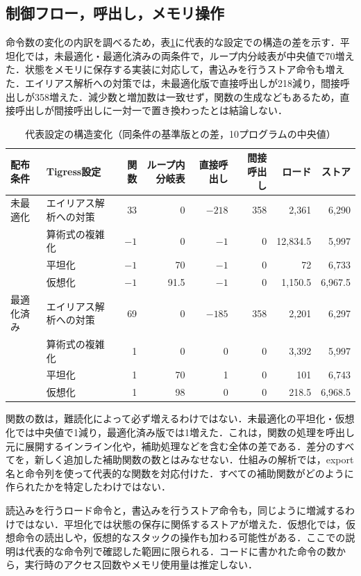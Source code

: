 \documentclass[submit,techrep]{ipsj}
\begin{document}
\subsection{制御フロー，呼出し，メモリ操作}
命令数の変化の内訳を調べるため，表\ref{tab:structure}に代表的な設定での構造の差を示す．平坦化では，未最適化・最適化済みの両条件で，ループ内分岐表が中央値で70増えた．状態をメモリに保存する実装に対応して，書込みを行うストア命令も増えた．エイリアス解析への対策では，未最適化版で直接呼出しが218減り，間接呼出しが358増えた．減少数と増加数は一致せず，関数の生成などもあるため，直接呼出しが間接呼出しに一対一で置き換わったとは結論しない．
\begin{table}[t]
\caption{代表設定の構造変化（同条件の基準版との差，10プログラムの中央値）}
\label{tab:structure}
\centering\small
\setlength{\tabcolsep}{4pt}
\begin{tabular}{llrrrrrr}
\hline
配布条件 & Tigress設定 & 関数 & ループ内分岐表 & 直接呼出し & 間接呼出し & ロード & ストア \\
\hline
未最適化 & エイリアス解析への対策 & 33 & 0 & $-218$ & 358 & 2,361 & 6,290 \\
 & 算術式の複雑化 & $-1$ & 0 & $-1$ & 0 & 12,834.5 & 5,997 \\
 & 平坦化 & $-1$ & 70 & $-1$ & 0 & 72 & 6,733 \\
 & 仮想化 & $-1$ & 91.5 & $-1$ & 0 & 1,150.5 & 6,967.5 \\
最適化済み & エイリアス解析への対策 & 69 & 0 & $-185$ & 358 & 2,201 & 6,297 \\
 & 算術式の複雑化 & 1 & 0 & 0 & 0 & 3,392 & 5,997 \\
 & 平坦化 & 1 & 70 & 1 & 0 & 101 & 6,743 \\
 & 仮想化 & 1 & 98 & 0 & 0 & 218.5 & 6,968.5 \\
\hline
\end{tabular}
\end{table}
関数の数は，難読化によって必ず増えるわけではない．未最適化の平坦化・仮想化では中央値で1減り，最適化済み版では1増えた．これは，関数の処理を呼出し元に展開するインライン化や，補助処理などを含む全体の差である．差分のすべてを，新しく追加した補助関数の数とはみなせない．仕組みの解析では，export名と命令列を使って代表的な関数を対応付けた．すべての補助関数がどのように作られたかを特定したわけではない．

読込みを行うロード命令と，書込みを行うストア命令も，同じように増減するわけではない．平坦化では状態の保存に関係するストアが増えた．仮想化では，仮想命令の読出しや，仮想的なスタックの操作も加わる可能性がある．ここでの説明は代表的な命令列で確認した範囲に限られる．コードに書かれた命令の数から，実行時のアクセス回数やメモリ使用量は推定しない．
\end{document}
